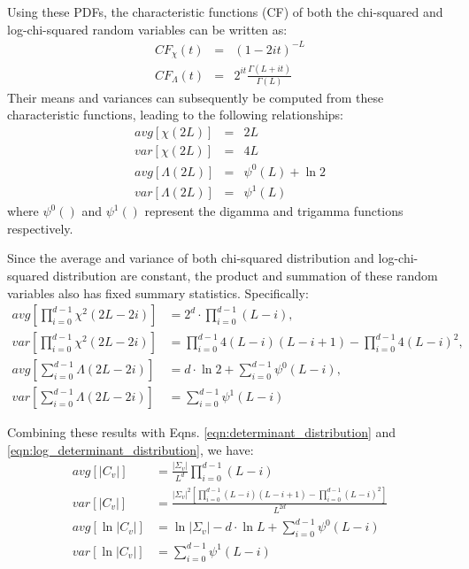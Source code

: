 \documentclass[journal]{IEEEtran}
\begin{document}
Using these PDFs, the characteristic functions (CF) of both the chi-squared and log-chi-squared random variables
  can be written as:
  \begin{eqnarray}
    CF_\chi(t) &=& (1-2it)^{−L} \\ 
    CF_\Lambda(t) &=& 2^{it} \frac{\Gamma(L+it)}{\Gamma(L)} \label{eqn:log_chi_squared_characteristic_function}
  \end{eqnarray}
 Their means and variances can subsequently be computed from these  characteristic functions, leading to the following relationships:  
  \begin{eqnarray}
    avg \left[ \chi(2L) \right]&=&2L \\
var \left[ \chi(2L) \right]&=&4L \\
avg \left[ \Lambda(2L) \right] &=& \psi^0(L) + \ln2 \\
var \left[ \Lambda(2L) \right] &=& \psi^1(L)
  \end{eqnarray}
  where $\psi^0()$ and $\psi^1()$ represent the digamma and trigamma functions respectively.

Since the average and variance of both chi-squared distribution and log-chi-squared distribution are constant,
  the product and summation of these random variables also has fixed summary statistics.
Specifically:
\begin{align*}
  avg \left[ \prod^{d-1}_{i=0} \chi^2(2L-2i) \right] &= 2^d \cdot \prod^{d-1}_{i=0} (L-i), \\
  var \left[ \prod^{d-1}_{i=0} \chi^2(2L-2i) \right] &= \prod^{d-1}_{i=0} 4(L-i)(L-i+1) - \prod^{d-1}_{i=0} 4(L-i)^2, \\
  avg \left[ \sum^{d-1}_{i=0} \Lambda(2L-2i) \right] &= d \cdot \ln{2} + \sum^{d-1}_{i=0} \psi^0(L-i), \\
  var \left[ \sum^{d-1}_{i=0} \Lambda(2L-2i) \right] &= \sum^{d-1}_{i=0} \psi^1(L-i)
\end{align*}

Combining these results with Eqns. \ref{eqn:determinant_distribution} and \ref{eqn:log_determinant_distribution}, we have:
\begin{align}
  avg \left[ |C_v| \right]  &= \frac{|\Sigma_v|}{L^d} \prod^{d-1}_{i=0} (L-i)\\
  var \left[ |C_v| \right]  &=   \frac{|\Sigma_v|^2 \left[ \prod^{d-1}_{i=0} (L-i)(L-i+1) - \prod^{d-1}_{i=0} (L-i)^2 \right] }{L^{2d}} \label{eqn:var_det_is_heteroskedastic}\\
  avg \left[ \ln |C_v| \right] &= \ln |\Sigma_v| - d \cdot \ln{L}  + \sum^{d-1}_{i=0} \psi^0(L-i) \label{eqn:avg_log_det} \\
  var \left[ \ln |C_v| \right] &=  \sum^{d-1}_{i=0} \psi^1(L-i) \label{eqn:var_log_det_is_homoskedastic}
\end{align}
\end{document}
